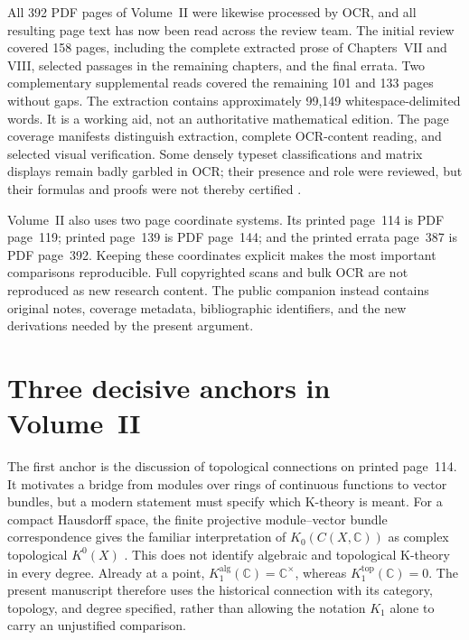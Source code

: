 All 392 PDF pages of Volume~II were likewise processed by OCR, and all
resulting page text has now been read across the review team. The initial
review covered 158 pages, including the complete extracted prose of
Chapters~VII and VIII, selected passages in the remaining chapters, and the
final errata. Two complementary supplemental reads covered the remaining
101 and 133 pages without gaps. The extraction contains approximately
99,149 whitespace-delimited words. It is a working aid, not an authoritative
mathematical edition. The page coverage manifests distinguish extraction,
complete OCR-content reading, and selected visual verification. Some densely
typeset classifications and matrix displays remain badly garbled in OCR;
their presence and role were reviewed, but their formulas and proofs were
not thereby certified \cite{v2Roggenkamp1970II}.

Volume~II also uses two page coordinate systems. Its printed page~114 is
PDF page~119; printed page~139 is PDF page~144; and the printed errata
page~387 is PDF page~392. Keeping these coordinates explicit makes the most
important comparisons reproducible. Full copyrighted scans and bulk OCR are
not reproduced as new research content. The public companion instead
contains original notes, coverage metadata, bibliographic identifiers, and
the new derivations needed by the present argument.

\section{Three decisive anchors in Volume~II}

The first anchor is the discussion of topological connections on printed
page~114. It motivates a bridge from modules over rings of continuous
functions to vector bundles, but a modern statement must specify which
K-theory is meant. For a compact Hausdorff space, the finite projective
module--vector bundle correspondence gives the familiar interpretation of
\(K_0(C(X,\mathbb C))\) as complex topological \(K^0(X)\)
\cite{v2Roggenkamp1970II,v2Swan1962}. This does not identify algebraic
and topological K-theory in every degree. Already at a point,
\(K_1^{\mathrm{alg}}(\mathbb C)=\mathbb C^\times\), whereas
\(K_1^{\mathrm{top}}(\mathbb C)=0\). The present manuscript therefore
uses the historical connection with its category, topology, and degree
specified, rather than allowing the notation \(K_1\) alone to carry an
unjustified comparison.

